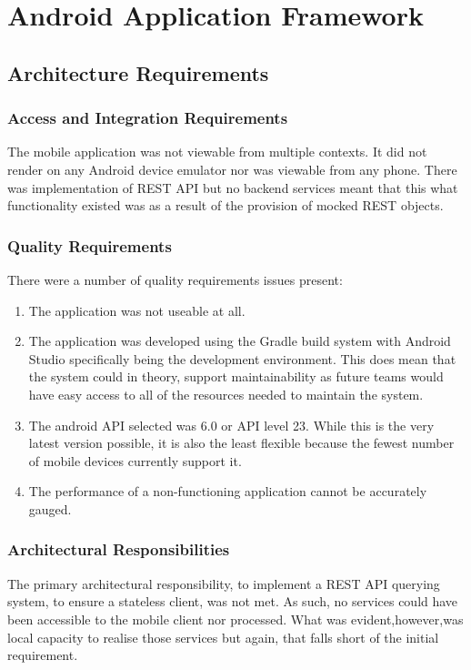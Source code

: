 \documentclass[a4paper,10pt]{article}
\begin{document}
\section{Android Application Framework}
  \subsection{Architecture Requirements}
    \subsubsection{Access and Integration Requirements}
  	The mobile application was not viewable from multiple contexts. It did not render on any Android device  emulator nor was viewable from any phone. There was implementation of REST API but no backend services meant that this what functionality existed was as a result of the provision of mocked REST objects. 
    \subsubsection{Quality Requirements}
    There were a number of quality requirements issues present:
    \begin{enumerate}
	\item The application was not useable at all.
	\item The application was developed using the Gradle build system with    Android Studio specifically being the development environment. This does mean that the system could in theory, support maintainability as future teams would have easy access to all of the resources needed to maintain the system.
	\item The android API selected was 6.0 or API level 23. While this is the very latest version possible, it is also the least flexible because the fewest number of mobile devices currently support it.
	
	\item The performance of a non-functioning application cannot be accurately gauged.
    \end{enumerate}
    \subsubsection{Architectural Responsibilities}
    The primary architectural responsibility, to implement a REST API querying system, to ensure a stateless client, was not met. As such, no services could have been accessible to the mobile client nor processed. What was evident,however,was local capacity to realise those services but again, that falls short of the initial requirement.
\end{document}
